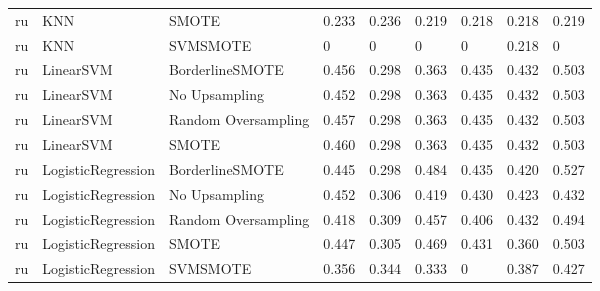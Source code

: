 \begin{tabular}{lllllllll}
      ru &                          KNN &               SMOTE & 0.233 &                     0.236 &                 0.219 &                  0.218 &                                   0.218 &     0.219 \\
      ru &                          KNN &            SVMSMOTE &     0 &                         0 &                     0 &                      0 &                                   0.218 &         0 \\
      ru &                    LinearSVM &     BorderlineSMOTE & 0.456 &                     0.298 &                 0.363 &                  0.435 &                                   0.432 &     0.503 \\
      ru &                    LinearSVM &       No Upsampling & 0.452 &                     0.298 &                 0.363 &                  0.435 &                                   0.432 &     0.503 \\
      ru &                    LinearSVM & Random Oversampling & 0.457 &                     0.298 &                 0.363 &                  0.435 &                                   0.432 &     0.503 \\
      ru &                    LinearSVM &               SMOTE & 0.460 &                     0.298 &                 0.363 &                  0.435 &                                   0.432 &     0.503 \\
      ru &           LogisticRegression &     BorderlineSMOTE & 0.445 &                     0.298 &                 0.484 &                  0.435 &                                   0.420 &     0.527 \\
      ru &           LogisticRegression &       No Upsampling & 0.452 &                     0.306 &                 0.419 &                  0.430 &                                   0.423 &     0.432 \\
      ru &           LogisticRegression & Random Oversampling & 0.418 &                     0.309 &                 0.457 &                  0.406 &                                   0.432 &     0.494 \\
      ru &           LogisticRegression &               SMOTE & 0.447 &                     0.305 &                 0.469 &                  0.431 &                                   0.360 &     0.503 \\
      ru &           LogisticRegression &            SVMSMOTE & 0.356 &                     0.344 &                 0.333 &                      0 &                                   0.387 &     0.427 \\

\end{tabular}
